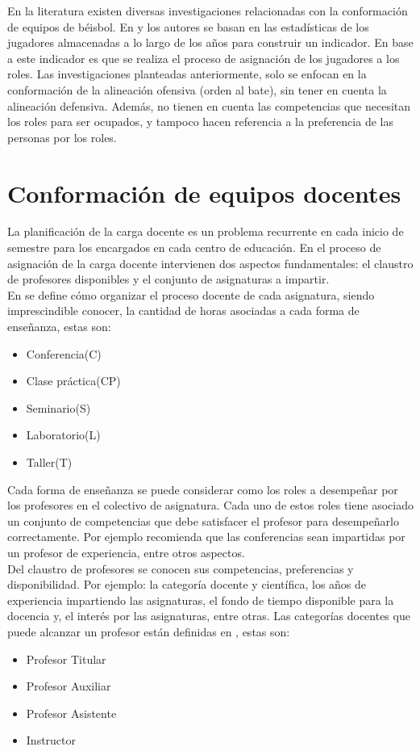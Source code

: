 En la literatura existen diversas investigaciones relacionadas con la conformación de equipos de béisbol. En \cite{Polyashuk2015} y \cite{Sugrue2007} los autores se basan en las estadísticas de los jugadores almacenadas a lo largo de los años para construir un indicador. En base a este indicador es que se realiza el proceso de asignación de los jugadores a los roles. Las investigaciones planteadas anteriormente, solo se enfocan en la conformación de la alineación ofensiva (orden al bate), sin tener en cuenta la alineación defensiva. Además, no tienen en cuenta las competencias que necesitan los roles para ser ocupados, y tampoco hacen referencia a la preferencia de las personas por los roles.

\section{Conformación de equipos docentes} \label{ej-carga}

La planificación de la carga docente es un problema recurrente en cada inicio de semestre para los encargados en cada centro de educación. En el proceso de asignación de la carga docente intervienen dos aspectos fundamentales: el claustro de profesores disponibles y el conjunto de asignaturas a impartir.\\

En \cite{res2018} se define cómo organizar el proceso docente de cada asignatura, siendo imprescindible conocer, la cantidad de horas asociadas a cada forma de enseñanza, estas son:
\begin{itemize}
	\item Conferencia(C)
	\item Clase práctica(CP)
	\item Seminario(S)
	\item Laboratorio(L)
	\item Taller(T)
\end{itemize}

Cada forma de enseñanza se puede considerar como los roles a desempeñar por los profesores en el colectivo de asignatura. Cada uno de estos roles tiene asociado un conjunto de competencias que debe satisfacer el profesor para desempeñarlo correctamente. Por ejemplo \cite{res2016} recomienda que las conferencias sean impartidas por un profesor de experiencia, entre otros aspectos.\\

Del claustro de profesores se conocen sus competencias, preferencias y disponibilidad. Por ejemplo: la categoría docente y científica, los años de experiencia impartiendo las asignaturas, el fondo de tiempo disponible para la docencia y, el interés por las asignaturas, entre otras. Las categorías docentes que puede alcanzar un profesor están definidas en \cite{res2016}, estas son:
\begin{itemize}
	\item Profesor Titular
	\item Profesor Auxiliar
	\item Profesor Asistente
	\item Instructor
\end{itemize} 

